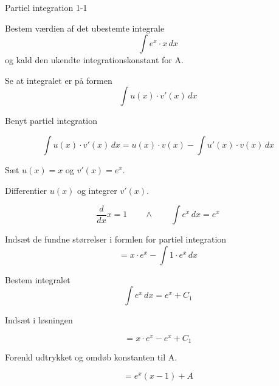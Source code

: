 \documentclass{article}
\begin{document}
\tableofcontents



\begin{exercise}{Partiel integration 1-1}
	
	
	Bestem værdien af det ubestemte integrale
	\[
	\int e^x \cdot x \, dx
	\]
	og kald den ukendte integrationskonstant for A.
	
	
	
	\hint
	
	Se at integralet er på formen
	\[
	\int u(x) \cdot v'(x) \, dx
	\]
	
	\hint
	
	Benyt partiel integration
	
	\hint
	\[
	\int u(x) \cdot v'(x)\, dx = u(x) \cdot v(x) - \int u'(x) \cdot v(x) \, dx
	\]
	\hint
	
	Sæt $u(x) = x$ og $v'(x) = e^x$.
	
	
	\hint
	
	Differentier $u(x)$ og integrer $v'(x)$.
	
	\hint
	\[
	\frac{d}{dx}x = 1 \qquad \wedge \qquad \int e^x \, dx = e^x
	\]
	
	\hint
	
	Indsæt de fundne størrelser i formlen for partiel integration
	\[
	= x \cdot e^x - \int 1 \cdot e^x \, dx
	\]
	
	\hint
	
	Bestem integralet
	\[
	\int e^x \, dx = e^x + C_1
	\]
	
	\hint
	Indsæt i løsningen 
	
	\hint
	
	\[
	= x \cdot e^x - e^x + C_1
	\]
	
	\hint
	
	Forenkl udtrykket og omdøb konstanten til A.
	
	\hint
	
	\[
	= e^x(x - 1)  + A
	\]
	
	
\end{exercise}

\newpage
\end{document}

